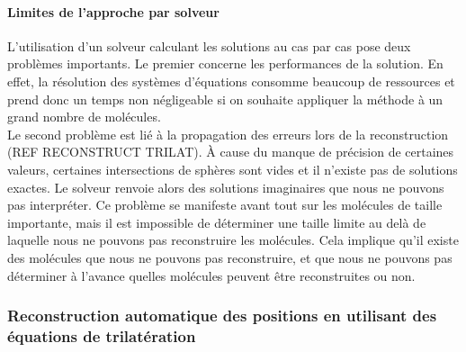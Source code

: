 \paragraph{Limites de l'approche par solveur} L'utilisation d'un solveur calculant les solutions au cas par cas pose deux problèmes importants. Le premier concerne les performances de la solution. En effet, la résolution des systèmes d'équations consomme beaucoup de ressources et prend donc un temps non négligeable si on souhaite appliquer la méthode à un grand nombre de molécules.\\
Le second problème est lié à la propagation des erreurs lors de la reconstruction (REF RECONSTRUCT TRILAT). À cause du manque de précision de certaines valeurs, certaines intersections de sphères sont vides et il n'existe pas de solutions exactes. Le solveur renvoie alors des solutions imaginaires que nous ne pouvons pas interpréter. Ce problème se manifeste avant tout sur les molécules de taille importante, mais il est impossible de déterminer une taille limite au delà de laquelle nous ne pouvons pas reconstruire les molécules. Cela implique qu'il existe des molécules que nous ne pouvons pas reconstruire, et que nous ne pouvons pas déterminer à l'avance quelles molécules peuvent être reconstruites ou non.

\subsubsection{Reconstruction automatique des positions en utilisant des équations de trilatération}


